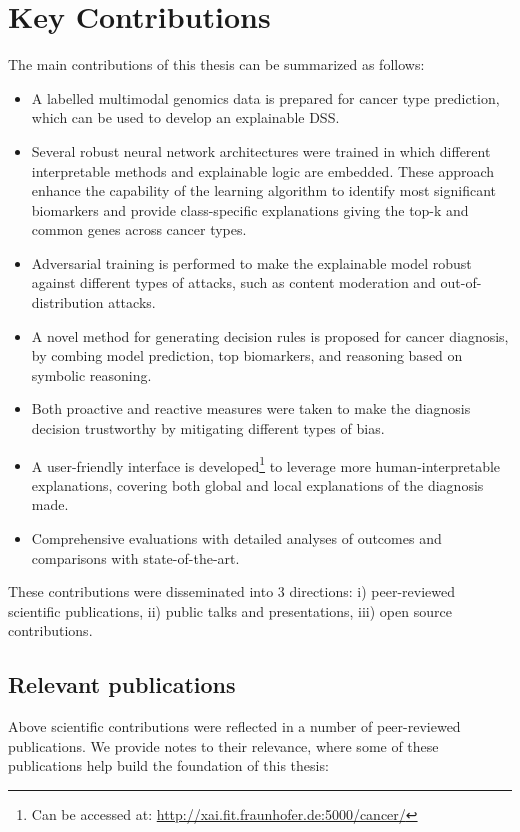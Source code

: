 \section{Key Contributions} \label{contributions}
The main contributions of this thesis can be summarized as follows:

\begin{itemize}[noitemsep]
    \item A labelled multimodal genomics data is prepared for cancer type prediction, which can be used to develop an explainable DSS.  
    \item Several robust neural network architectures were trained in which different interpretable methods and explainable logic are embedded. These approach enhance the capability of the learning algorithm to identify most significant biomarkers and provide class-specific explanations giving the top-k and common genes across cancer types. 
    \item Adversarial training is performed to make the explainable model robust against different types of attacks, such as content moderation and out-of-distribution attacks. 
    \item A novel method for generating decision rules is proposed for cancer diagnosis, by combing model prediction, top biomarkers, and reasoning based on symbolic reasoning. 
    \item Both proactive and reactive measures were taken to make the diagnosis decision trustworthy by mitigating different types of bias. 
    \item A user-friendly interface is developed\footnote{Can be accessed at: \url{http://xai.fit.fraunhofer.de:5000/cancer/}} to leverage more human-interpretable explanations, covering both global and local explanations of the diagnosis made. 
    \item Comprehensive evaluations with detailed analyses of outcomes and comparisons with state-of-the-art. 
\end{itemize}

\hspace*{3.5mm} These contributions were disseminated into 3 directions: i) peer-reviewed scientific publications, ii) public talks and presentations, iii) open source contributions. %

\subsection{Relevant publications}
Above scientific contributions were reflected in a number of peer-reviewed publications. We provide notes to their relevance, where some of these publications help build the foundation of this thesis: 

